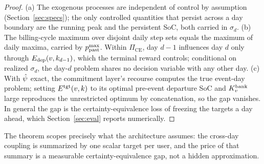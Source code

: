 \begin{proof}
(a) The exogenous processes are independent of control by assumption
(Section~\ref{sec:specs}); the only controlled quantities that persist
across a day boundary are the running peak and the persistent SoC,
both carried in $\sigma_d$. (b) The billing-cycle maximum over
disjoint daily step sets equals the maximum of daily maxima, carried
by $p^{\max}_{\mathrm{past}}$. Within $\Pi_{\mathrm{CE}}$, day $d{-}1$ influences day
$d$ only through $E_{\mathrm{dep}}(v, k_{d-1})$, which the terminal reward
controls; conditional on realized $\sigma_d$, the day-$d$ problem
shares no decision variable with any other day. (c) With $\hat{\psi}$
exact, the commitment layer's recourse computes the true event-day
problem; setting $E^{\mathrm{tgt}}(v,k)$ to its optimal pre-event departure SoC
and $K^{\mathrm{bank}}_{v}$ large reproduces the unrestricted optimum by
concatenation, so the gap vanishes. In general the gap is the
certainty-equivalence loss of freezing the targets a day ahead, which
Section~\ref{sec:eval} reports numerically.
\end{proof}

The theorem scopes precisely what the architecture assumes: the
cross-day coupling is summarized by one scalar target per user, and
the price of that summary is a measurable certainty-equivalence gap,
not a hidden approximation.